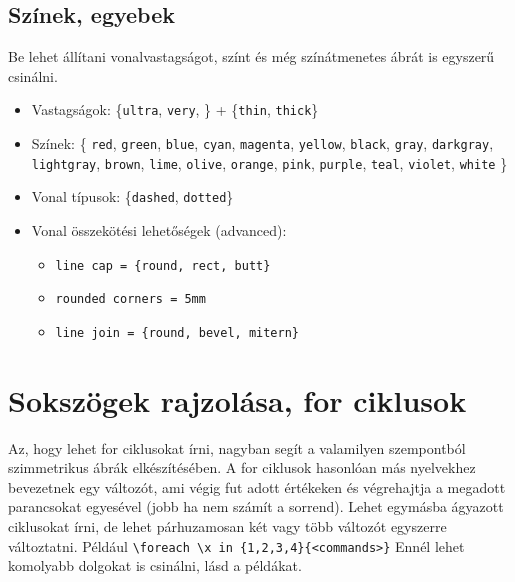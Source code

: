 \subsection{Színek, egyebek}

Be lehet állítani vonalvastagságot, színt és még színátmenetes ábrát is egyszerű csinálni.
\begin{itemize}
    \item Vastagságok: \{\verb|ultra|, \verb|very|, \} + \{\verb|thin|, \verb|thick|\}
    \item Színek: \{ \verb|red|, \verb|green|, \verb|blue|, \verb|cyan|, \verb|magenta|, \verb|yellow|, \verb|black|, \verb|gray|, \verb|darkgray|, \verb|lightgray|, \verb|brown|, \verb|lime|, \verb|olive|, \verb|orange|, \verb|pink|, \verb|purple|, \verb|teal|, \verb|violet|, \verb|white| \}
    \item Vonal típusok: \{\verb|dashed|, \verb|dotted|\}
    \item Vonal összekötési lehetőségek (advanced): \begin{itemize}
        \item \verb|line cap = {round, rect, butt}|
        \item \verb|rounded corners = 5mm|
        \item \verb|line join = {round, bevel, mitern}|
        \end{itemize}
\end{itemize}

\begin{Example}
\end{Example}

\section{Sokszögek rajzolása, for ciklusok}

Az, hogy lehet for ciklusokat írni, nagyban segít a valamilyen szempontból szimmetrikus ábrák elkészítésében. A for ciklusok hasonlóan más nyelvekhez bevezetnek egy változót, ami végig fut adott értékeken és végrehajtja a megadott parancsokat egyesével (jobb ha nem számít a sorrend).  Lehet egymásba ágyazott ciklusokat írni, de lehet párhuzamosan két vagy több változót egyszerre változtatni. Például \verb|\foreach \x in {1,2,3,4}{<commands>}| Ennél lehet komolyabb dolgokat is csinálni, lásd a példákat.

